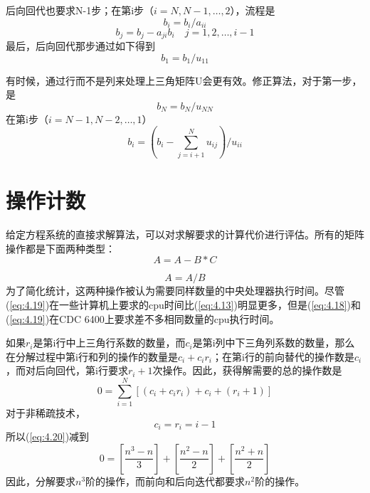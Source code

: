 后向回代也要求N-1步；在第i步（$i=N,N-1,\dots,2$），流程是
\begin{equation}
    b_i = b_i/a_{ii}
    \label{eq:4.13}
\end{equation}
\begin{equation}
    b_j = b_j -a_{ji}b_i \quad j =1,2,\dots,i-1
    \label{eq:4.14}
\end{equation}
最后，后向回代那步通过如下得到
\begin{equation}
    b_1 = b_1/u_{11}
    \label{eq:4.15}
\end{equation}

有时候，通过行而不是列来处理上三角矩阵U会更有效。修正算法，对于第一步，是
\begin{equation}
    b_N = b_N/u_{NN}
    \label{eq:4.16}
\end{equation}
在第i步（$i = N-1,N-2,\dots,1$）
\begin{equation}
    b_i = (b_i - \sum^N_{j=i+1}u_{ij})/u_{ii}
    \label{eq:4.17}
\end{equation}

\section{操作计数}
给定方程系统的直接求解算法，可以对求解要求的计算代价进行评估。所有的矩阵操作都是下面两种类型：
\begin{equation}
    A = A-B*C
    \label{eq:4.18}
\end{equation}

\begin{equation}
    A = A/B
    \label{eq:4.19}
\end{equation}
为了简化统计，这两种操作被认为需要同样数量的中央处理器执行时间。尽管(\ref{eq:4.19})在一些计算机上要求的cpu时间比(\ref{eq:4.13})明显更多，但是(\ref{eq:4.18})和(\ref{eq:4.19})在CDC 6400上要求差不多相同数量的cpu执行时间。

如果$r_i$是第i行中上三角行系数的数量，而$c_i$是第i列中下三角列系数的数量，那么在分解过程中第i行和列的操作的数量是$c_i + c_i r_i$；在第i行的前向替代的操作数是$c_i$，而对后向回代，第i行要求$r_i+1$次操作。因此，获得解需要的总的操作数是
\begin{equation}
    0 = \sum^N_{i=1}[(c_i+c_i r_i)+c_i+(r_i+1)]
    \label{eq:4.20}
\end{equation}
对于非稀疏技术，
\begin{equation}
    c_i = r_i = i-1
    \label{eq:4.21}
\end{equation}
所以(\ref{eq:4.20})减到
\begin{equation}
    0 = [\frac{n^3-n}{3}]+[\frac{n^2-n}{2}]+[\frac{n^2+n}{2}]
    \label{eq:4.22}
\end{equation}
因此，分解要求$n^3$阶的操作，而前向和后向迭代都要求$n^2$阶的操作。


